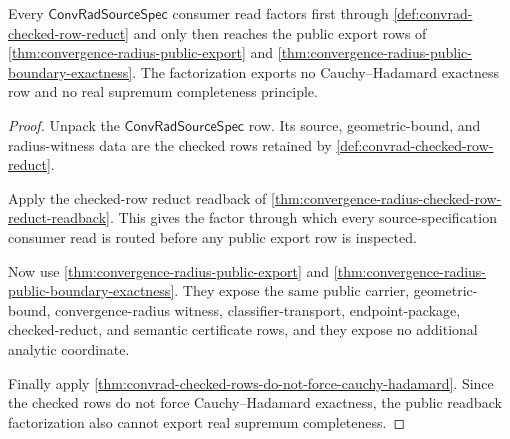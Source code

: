 \begin{theorem}
\label{thm:convergence-radius-checked-row-readback-public-factorization}
Every $\mathsf{ConvRadSourceSpec}$ consumer read factors first through
\autoref{def:convrad-checked-row-reduct} and only then reaches the public
export rows of \autoref{thm:convergence-radius-public-export} and
\autoref{thm:convergence-radius-public-boundary-exactness}. The factorization
exports no Cauchy--Hadamard exactness row and no real supremum completeness
principle.
\end{theorem}
\begin{proof}
Unpack the $\mathsf{ConvRadSourceSpec}$ row. Its source, geometric-bound, and
radius-witness data are the checked rows retained by
\autoref{def:convrad-checked-row-reduct}.

Apply the checked-row reduct readback of
\autoref{thm:convergence-radius-checked-row-reduct-readback}. This gives the
factor through which every source-specification consumer read is routed before
any public export row is inspected.

Now use \autoref{thm:convergence-radius-public-export} and
\autoref{thm:convergence-radius-public-boundary-exactness}. They expose the
same public carrier, geometric-bound, convergence-radius witness,
classifier-transport, endpoint-package, checked-reduct, and semantic
certificate rows, and they expose no additional analytic coordinate.

Finally apply
\autoref{thm:convrad-checked-rows-do-not-force-cauchy-hadamard}. Since the
checked rows do not force Cauchy--Hadamard exactness, the public readback
factorization also cannot export real supremum completeness.
\end{proof}

